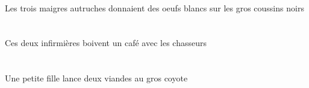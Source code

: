 \begin{exe}
    \DEFPlOblG{}   \grosBPlG{}   \noirBPlG{}   \coussinBPlOblG{}   \SURG{}   \DEFPlErgG{}   \troisBPlG{}   \maigreBPlG{}   \autrucheBPlErgG{}   \INDPlAbsG{}   \blancCPlG{}   \oeufCPlAbsG{}  \donnerVdPstCPlG{} \\
 Les trois maigres autruches donnaient des oeufs blancs sur les gros coussins noirs
\ex\glll
    \DEFPlObl{}   \chasseurCPlObl{}   \AVEC{}   \DEMDuErg{}   \infirmiereADuErg{}   \INDSgAbs{}   \cafeCSgAbs{}  \boireVtPrsCSg{} \\
    \DEFPlOblP{}   \chasseurCPlOblP{}   \AVECP{}   \DEMDuErgP{}   \infirmiereADuErgP{}   \INDSgAbsP{}   \cafeCSgAbsP{}  \boireVtPrsCSgP{} \\
    \DEFPlOblG{}   \chasseurCPlOblG{}   \AVECG{}   \DEMDuErgG{}   \infirmiereADuErgG{}   \INDSgAbsG{}   \cafeCSgAbsG{}  \boireVtPrsCSgG{} \\
 Ces deux infirmières boivent un café avec les chasseurs
\ex\glll
   \INDSgErg{}   \petitCSg{}   \filleCSgErg{}    \DEFSgObl{}   \grosCSg{}   \coyoteCSgObl{}   \A{}   \INDDuAbs{}   \viandeADuAbs{}  \lancerVdPrsADu{} \\
   \INDSgErgP{}   \petitCSgP{}   \filleCSgErgP{}    \DEFSgOblP{}   \grosCSgP{}   \coyoteCSgOblP{}   \AP{}   \INDDuAbsP{}   \viandeADuAbsP{}  \lancerVdPrsADuP{} \\
   \INDSgErgG{}   \petitCSgG{}   \filleCSgErgG{}    \DEFSgOblG{}   \grosCSgG{}   \coyoteCSgOblG{}   \AG{}   \INDDuAbsG{}   \viandeADuAbsG{}  \lancerVdPrsADuG{} \\
 Une petite fille lance deux viandes au gros coyote
\end{exe}
